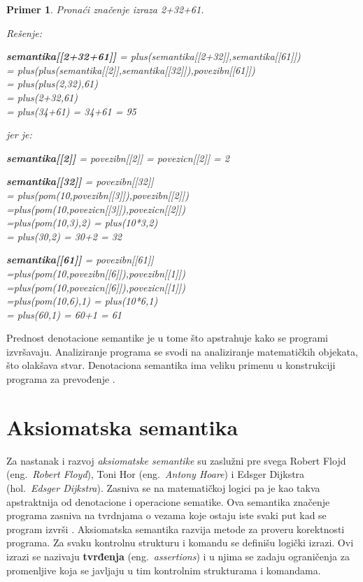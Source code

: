 \documentclass[a4paper]{article}
\newtheorem{primer}{Primer}[section]
\begin{document}
\begin{primer}
Pronaći značenje izraza 2+32+61.

Rešenje:
\begin{center}
\textbf{semantika[[2+32+61]]} = plus(semantika[[2+32]],semantika[[61]])\\
= plus(plus(semantika[[2]],semantika[[32]]),povezibn[[61]])\\
= plus(plus(2,32),61)\\
= plus(2+32,61)\\
= plus(34+61) = 34+61 = 95
\end{center}

jer je:

\begin{center}
\textbf{semantika[[2]]} = povezibn[[2]] = povezicn[[2]] = 2
\end{center}
\begin{center}
\textbf{semantika[[32]]} = povezibn[[32]]\\
= plus(pom(10,povezibn[[3]]),povezibn[[2]])\\
=plus(pom(10,povezicn[[3]]),povezicn[[2]]) \\
=plus(pom(10,3),2) = plus(10*3,2)\\
= plus(30,2) = 30+2 = 32\end{center}

\begin{center}
\textbf{semantika[[61]]} = povezibn[[61]] \\
=plus(pom(10,povezibn[[6]]),povezibn[[1]])\\
=plus(pom(10,povezicn[[6]]),povezicn[[1]]) \\
=plus(pom(10,6),1) = plus(10*6,1)\\
= plus(60,1) = 60+1 = 61

\end{center}
\end{primer}

 Prednost denotacione semantike je u tome što apstrahuje kako se programi izvršavaju. Analiziranje programa se svodi na analiziranje matematičkih objekata, što olakšava stvar. Denotaciona semantika ima veliku primenu u konstrukciji programa za prevođenje \cite{parezanovic}.

\section{Aksiomatska semantika}
\label{sec:akssem}
\qquad Za nastanak i razvoj \textit{aksiomatske semantike}  su zaslužni pre svega Robert Flojd (eng.~{\em  Robert Floyd}), Toni Hor (eng.~{\em  Antony Hoare}) i Edsger Dijkstra (hol.~{\em Edsger Dijkstra}).
 Zasniva se na matematičkoj logici pa je kao takva apstraktnija od denotacione i operacione sematike. Ova semantika
 značenje programa zasniva na tvrdnjama o vezama koje ostaju iste svaki put kad se program izvrši \cite{slonneger1995book}.
 Aksiomatska semantika razvija metode za proveru korektnosti programa. Za svaku kontrolnu strukturu i komandu se definišu logički izrazi. Ovi izrazi se nazivaju \textbf{tvrđenja} (eng.~{\em  assertions}) i u njima se zadaju ograničenja za promenljive koja se javljaju u tim kontrolnim strukturama i komandama.
\end{document}
